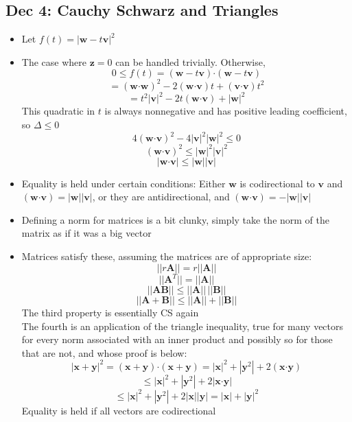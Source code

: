 \documentclass[10pt, oneside]{article}
\let\leq\leqslant
\newcommand{\Cdot}{\boldsymbol{\cdot}}
\renewcommand{\vec}[1]{\mathbf{#1}}
\newcommand{\mat}[1]{\mathbf{#1}}
\begin{document}
\subsection{Dec 4: Cauchy Schwarz and Triangles}
\begin{itemize}
    \item Let $f(t) = |\vec{w} - t\vec{v}|^2$
    \item The case where $\vec{z} = 0$ can be handled trivially. Otherwise, 
        \[0 \leq f(t) = (\vec{w} - t\vec{v})\Cdot(\vec{w} - t\vec{v})\]
        \[= (\vec{w} \Cdot \vec{w})^2 - 2(\vec{w} \Cdot \vec{v})t + (\vec{v} \Cdot \vec{v}) t^2\]
        \[= t^2 |\vec{v}|^2 - 2t(\vec{w} \Cdot \vec{v}) + |\vec{w}|^2\]
        This quadratic in $t$ is always nonnegative and has positive leading coefficient, so $\Delta \leq 0$
        \[4(\vec{w} \Cdot \vec{v})^2 - 4|\vec{v}|^2|\vec{w}|^2 \leq 0\]
        \[(\vec{w} \Cdot \vec{v})^2 \leq |\vec{w}|^2|\vec{v}|^2\]
        \[|\vec{w} \Cdot \vec{v}| \leq |\vec{w}||\vec{v}|\]
    \item Equality is held under certain conditions: Either $\vec{w}$ is codirectional to $\vec{v}$ and $(\vec{w} \Cdot \vec{v}) = |\vec{w}||\vec{v}|$, or they are antidirectional, and $(\vec{w} \Cdot \vec{v}) = -|\vec{w}||\vec{v}|$
    \item Defining a norm for matrices is a bit clunky, simply take the norm of the matrix as if it was a big vector
    \item Matrices satisfy these, assuming the matrices are of appropriate size:   
        \[||r\mat{A}|| = r||\mat{A}||\]
        \[||\mat{A}^T|| = ||\mat{A}||\]
        \[||\mat{AB}|| \leq ||\mat{A}||\,||\mat{B}||\]
        \[||\mat{A} + \mat{B}|| \leq ||\mat{A}|| + ||\mat{B}||\]
        The third property is essentially CS again\\
        The fourth is an application of the triangle inequality, true for many vectors for every norm associated with an inner product and possibly so for those that are not, and whose proof is below:
        \[|\vec{x} + \vec{y}|^2 = (\vec{x} + \vec{y})\Cdot(\vec{x} + \vec{y}) = |\vec{x}|^2 + |\vec{y}^2| + 2(\vec{x} \Cdot \vec{y})\]
        \[\leq |\vec{x}|^2 + |\vec{y}^2| + 2|\vec{x} \Cdot \vec{y}|\]
        \[\leq |\vec{x}|^2 + |\vec{y}^2| + 2|\vec{x}||\vec{y}| = |\vec{x}| + |\vec{y}|^2\]
        Equality is held if all vectors are codirectional
\end{itemize}
\end{document}
